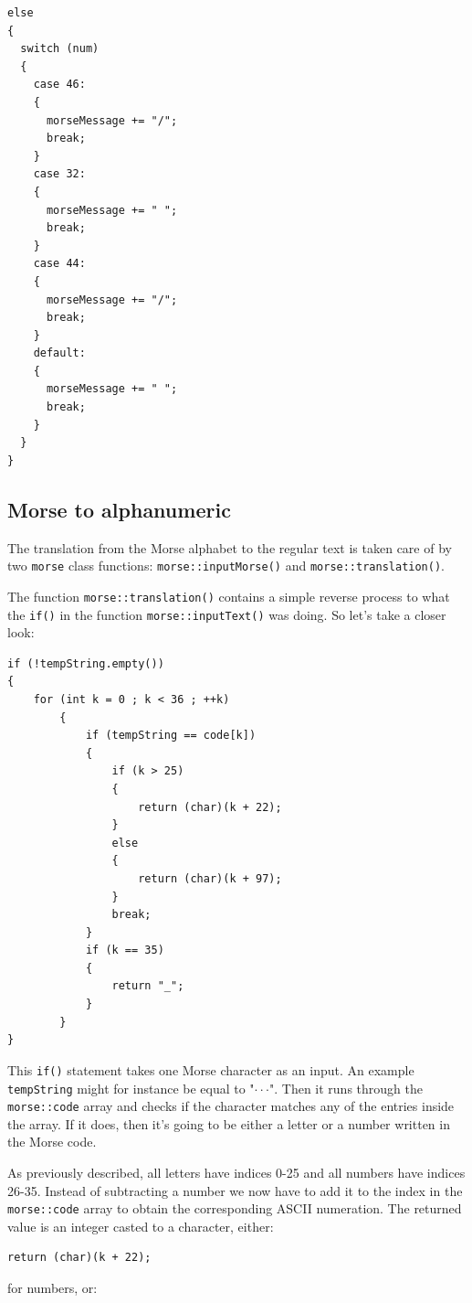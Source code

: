 \documentclass[12pt]{report}
\begin{document}
\newpage

\begin{lstlisting}
else
{
  switch (num)
  {
    case 46:
    {
      morseMessage += "/";
      break;
    }
    case 32:
    {
      morseMessage += " ";
      break;
    }
    case 44:
    {
      morseMessage += "/";
      break;
    }
    default:
    {
      morseMessage += " ";
      break;
    }
  }
}
\end{lstlisting}


\subsection{Morse to alphanumeric}

The translation from the Morse alphabet to the regular text is taken care of by two \verb|morse| class functions: \verb|morse::inputMorse()| and \verb|morse::translation()|.

The function \verb|morse::translation()| contains a simple reverse process to what the \verb|if()| in the function \verb|morse::inputText()| was doing. So let's take a closer look:

\newpage

\begin{lstlisting}
if (!tempString.empty())
{
	for (int k = 0 ; k < 36 ; ++k)
		{
			if (tempString == code[k])
			{
				if (k > 25)
				{
					return (char)(k + 22);
				}
				else	
				{
					return (char)(k + 97);
				}
				break;
			}
			if (k == 35)	
			{
				return "_";
			}
		}
}
\end{lstlisting}

This \verb|if()| statement takes one Morse character as an input. An example \verb|tempString| might for instance be equal to "$\cdot\cdot$\text{-}$\cdot$". Then it runs through the \verb|morse::code| array and checks if the character matches any of the entries inside the array. If it does, then it's going to be either a letter or a number written in the Morse code.

As previously described, all letters have indices 0-25 and all numbers have indices 26-35. Instead of subtracting a number we now have to add it to the index in the \verb|morse::code| array to obtain the corresponding ASCII numeration. The returned value is an integer casted to a character, either:

\begin{lstlisting}
return (char)(k + 22);
\end{lstlisting}

for numbers, or:
\end{document}
